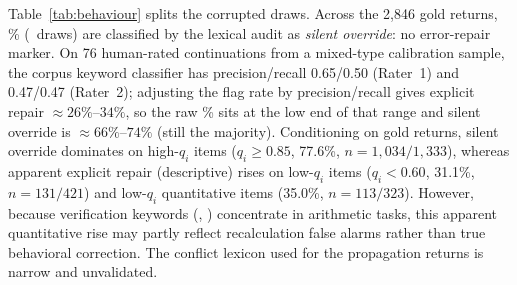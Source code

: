 Table~\ref{tab:behaviour} splits the corrupted draws. Across the 2,846 gold returns, \GoldSilentOverridePct\% (\GoldSilentOverrideCount\ draws) are classified by the lexical audit as \emph{silent override}: no error-repair marker. On 76 human-rated continuations from a mixed-type calibration sample, the corpus keyword classifier has precision/recall 0.65/0.50 (Rater~1) and 0.47/0.47 (Rater~2); adjusting the flag rate by precision/recall gives explicit repair $\approx 26\%$--$34\%$, so the raw \GoldExplicitRepairPct\% sits at the low end of that range and silent override is $\approx 66\%$--$74\%$ (still the majority). Conditioning on gold returns, silent override dominates on high-$q_i$ items ($q_i \ge 0.85$, 77.6\%, $n=1{,}034/1{,}333$), whereas apparent explicit repair (descriptive) rises on low-$q_i$ items ($q_i < 0.60$, 31.1\%, $n=131/421$) and low-$q_i$ quantitative items (35.0\%, $n=113/323$). However, because verification keywords (, ) concentrate in arithmetic tasks, this apparent quantitative rise may partly reflect recalculation false alarms rather than true behavioral correction. The conflict lexicon used for the propagation returns is narrow and unvalidated.
